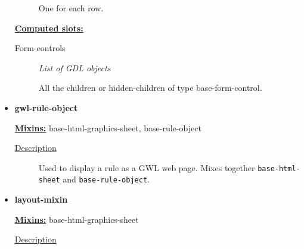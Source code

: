 \documentclass [11pt]{book}
\begin{document}
\begin{itemize}
\begin{description}
 One for each row.




\end{description}






\textbf{
\underline{Computed slots:}}

\begin{description}

\item [Form-controls]
\emph{List of GDL objects}

 All the children or hidden-children
of type base-form-control.




\end{description}







\item {}
\label{prim:gwl-rule-object}
\textbf{gwl-rule-object}


\textbf{
\underline{Mixins:}} base-html-graphics-sheet, base-rule-object





\begin{description}

\item [
\underline{Description}]


Used to display a rule as a GWL web page. 
Mixes together \texttt{base-html-sheet} and \texttt{base-rule-object}.



\end{description}









\item {}
\label{prim:layout-mixin}
\textbf{layout-mixin}


\textbf{
\underline{Mixins:}} base-html-graphics-sheet





\begin{description}

\item [
\underline{Description}]



\end{description}
\end{itemize}
\end{document}

